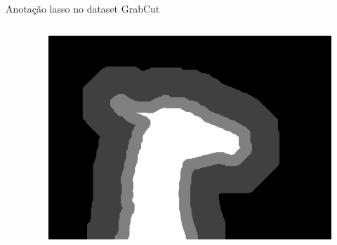 \documentclass{templatebeamerufc/libs/ufc_format}
\begin{document}
\begin{frame}{Anotação lasso no dataset GrabCut}

  \begin{columns}{}

    \begin{column}{0.62\textwidth}
      \begin{table}[!h]\label{tab:grabcut-label}
        \centering
      \end{table}
    \end{column}

    \begin{column}{0.6\textwidth}
      \begin{figure}\label{fig:grabcut-dataset-lasso}
        \centering
        \includegraphics[scale=0.35]{figuras/grabcut-dataset-lasso}
      \end{figure}
    \end{column}

  \end{columns}
\end{frame}
\end{document}
